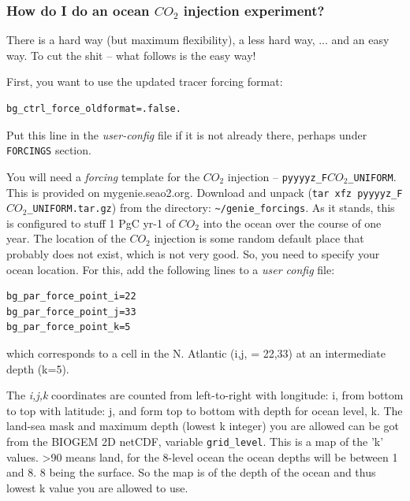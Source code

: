 \documentclass[11pt,fleqn]{book} %
\begin{document}
%
\subsubsection{How do I do an ocean \(CO_{2}\) injection experiment?}

There is a hard way (but maximum flexibility), a less hard way, ... and an easy way. To cut the shit -- what follows is the easy way!

\vspace{1mm}
First, you want to use the updated tracer forcing format:
\vspace{-2mm}\small\begin{verbatim}
bg_ctrl_force_oldformat=.false.
\end{verbatim}\normalsize\vspace{-2mm}
Put this line in the \textit{user-config} file if it is not already there, perhaps under \texttt{FORCINGS} section.

\vspace{1mm}
You will need a \textit{forcing} template for the \(CO_{2}\) injection -- \texttt{pyyyyz\_F\(CO_{2}\)\_UNIFORM}. This is provided on mygenie.seao2.org. Download and unpack (\texttt{tar xfz pyyyyz\_F\(CO_{2}\)\_UNIFORM.tar.gz}) from the directory: \texttt{\~{}/genie\_forcings}.
As it stands, this is configured to stuff 1 PgC yr-1 of \(CO_{2}\) into the ocean over the course of one year. The location of the \(CO_{2}\) injection is some random default place that probably does not exist, which is not very good. So, you need to specify your ocean location. For this, add the following lines to a \textit{user config} file:
\vspace{-2mm}\small\begin{verbatim}
bg_par_force_point_i=22
bg_par_force_point_j=33
bg_par_force_point_k=5
\end{verbatim}\normalsize\vspace{-2mm}
which corresponds to a cell in the N. Atlantic (i,j, = 22,33) at an intermediate depth (k=5).

The \textit{i,j,k} coordinates are counted from left-to-right with longitude: i, from bottom to top with latitude: j, and form top to bottom with depth for ocean level, k. The land-sea mask and maximum depth (lowest k integer) you are allowed can be got from the BIOGEM  2D netCDF, variable \texttt{grid\_level}. This is a map of the 'k' values. >90 means land, for the 8-level ocean the ocean depths will be between 1 and 8. 8 being the surface. So the map is of the depth of the ocean and thus lowest k value you are allowed to use.
\end{document}
